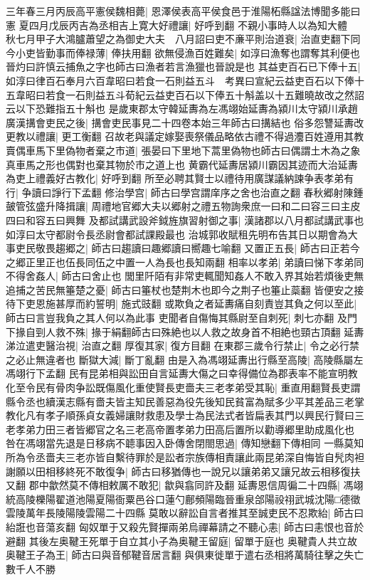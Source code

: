 三年春三月丙辰高平憲侯魏相薨|{
	恩澤侯表高平侯食邑于淮陽柘縣諡法博聞多能曰憲}
夏四月戊辰丙吉為丞相吉上寛大好禮讓|{
	好呼到翻}
不親小事時人以為知大體　秋七月甲子大鴻臚蕭望之為御史大夫　八月詔曰吏不亷平則治道衰|{
	治直吏翻下同}
今小吏皆勤事而俸禄薄|{
	俸扶用翻}
欲無侵漁百姓難矣|{
	如淳曰漁奪也謂奪其利便也晉灼曰許慎云捕魚之字也師古曰漁者若言漁獵也晉說是也}
其益吏百石已下俸十五|{
	如淳曰律百石奉月六百韋昭曰若食一石則益五斗　考異曰宣紀云益吏百石以下俸十五韋昭曰若食一石則益五斗荀紀云益吏百石以下俸五十斛盖以十五難曉故改之然詔云以下恐難指五十斛也}
是歲東郡太守韓延夀為左馮翊始延夀為潁川太守潁川承趙廣漢搆會吏民之後|{
	搆會吏民事見二十四卷本始三年師古曰搆結也}
俗多怨讐延夀改更教以禮讓|{
	更工衡翻}
召故老與議定嫁娶喪祭儀品略依古禮不得過灋百姓遵用其教賣偶車馬下里偽物者棄之市道|{
	張晏曰下里地下蒿里偽物也師古曰偶謂土木為之象真車馬之形也偶對也棄其物於市之道上也}
黄霸代延夀居潁川霸因其迹而大治延夀為吏上禮義好古教化|{
	好呼到翻}
所至必聘其賢士以禮待用廣謀議納諫争表孝弟有行|{
	争讀曰諍行下孟翻}
修治學宫|{
	師古曰學宫謂庠序之舍也治直之翻}
春秋郷射陳鍾皷管弦盛升降揖讓|{
	周禮地官郷大夫以郷射之禮五物詢衆庶一曰和二曰容三曰主皮四曰和容五曰興舞}
及都試講武設斧鉞旌旗習射御之事|{
	漢諸郡以八月都試講武事也如淳曰太守都尉令長丞尉會都試課殿最也}
治城郭收賦租先明布告其日以期會為大事吏民敬畏趨郷之|{
	師古曰趨讀曰趣郷讀曰嚮趣七喻翻}
又置正五長|{
	師古曰正若今之郷正里正也伍長同伍之中置一人為長也長知兩翻}
相率以孝弟|{
	弟讀曰悌下孝弟同}
不得舍姦人|{
	師古曰舍止也}
閭里阡陌有非常吏輒聞知姦人不敢入界其始若煩後吏無追捕之苦民無箠楚之憂|{
	師古曰箠杖也楚荆木也即今之荆子也箠止蘂翻}
皆便安之接待下吏恩施甚厚而約誓明|{
	施式豉翻}
或欺負之者延夀痛自刻責豈其負之何以至此|{
	師古曰言豈我負之其人何以為此事}
吏聞者自傷悔其縣尉至自刺死|{
	刺七亦翻}
及門下掾自剄人救不殊|{
	掾于絹翻師古曰殊絶也以人救之故身首不相絶也頸古頂翻}
延夀涕泣遣吏醫治視|{
	治直之翻}
厚復其家|{
	復方目翻}
在東郡三歲令行禁止|{
	令之必行禁之必止無違者也}
斷獄大減|{
	斷丁亂翻}
由是入為馮翊延夀出行縣至高陵|{
	高陵縣屬左馮翊行下孟翻}
民有昆弟相與訟田自言延夀大傷之曰幸得備位為郡表率不能宣明教化至令民有骨肉争訟既傷風化重使賢長吏嗇夫三老孝弟受其恥|{
	重直用翻賢長吏謂縣令丞也續漢志縣有嗇夫皆主知民善惡為役先後知民貧富為賦多少平其差品三老掌教化凡有孝子順孫貞女義婦讓財救患及學士為民法式者皆扁表其門以興民行賢曰三老孝弟力田三者皆郷官之名三老高帝置孝弟力田高后置所以勸導郷里助成風化也}
咎在馮翊當先退是日移病不聼事因入卧傳舍閉閤思過|{
	傳知戀翻下傳相同}
一縣莫知所為令丞嗇夫三老亦皆自繫待罪於是訟者宗族傳相責讓此兩昆弟深自悔皆自髠肉袒謝願以田相移終死不敢復争|{
	師古曰移猶傳也一說兄以讓弟弟又讓兄故云相移復扶又翻}
郡中歙然莫不傳相敕厲不敢犯|{
	歙與翕同許及翻}
延夀恩信周徧二十四縣|{
	馮翊統高陵櫟陽翟道池陽夏陽衙粟邑谷口蓮勺鄜頻陽臨晉重泉郃陽祋祤武城沈陽□德徵雲陵萬年長陵陽陵雲陽二十四縣}
莫敢以辭訟自言者推其至誠吏民不忍欺紿|{
	師古曰紿誑也音蕩亥翻}
匈奴單于又殺先賢撣兩弟烏禪幕請之不聽心恚|{
	師古曰恚恨也音於避翻}
其後左奥鞬王死單于自立其小子為奥鞬王留庭|{
	留單于庭也}
奥鞬貴人共立故奥鞬王子為王|{
	師古曰與音郁鞬音居言翻}
與俱東徙單于遣右丞相將萬騎往擊之失亡數千人不勝

